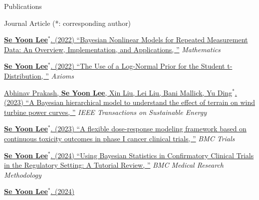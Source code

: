 \documentclass[
	11pt, %
]{resume} %
\begin{document}
\begin{rSection}{Publications}
\begin{rSubsection}{Journal Article (*: corresponding author)}{}{}{}
\item[] [7]
\href{https://www.mdpi.com/2227-7390/10/6/898}
{\underline{\textbf{Se Yoon Lee}$^{*}$}. (2022)
``Bayesian Nonlinear Models for Repeated Measurement Data: An Overview, Implementation, and Applications, ''} \textit{Mathematics} 
\item[] [8]
\href{https://www.mdpi.com/2075-1680/11/9/462}
{\underline{\textbf{Se Yoon Lee}$^{*}$}. (2022)
``The Use of a Log-Normal Prior for the Student t-Distribution, ''} \textit{Axioms} 
\item[] [9]
\href{https://ieeexplore.ieee.org/document/10301539}
{Abhinav Prakash, \underline{\textbf{Se Yoon Lee}}, Xin Liu, Lei Liu,  Bani Mallick, Yu Ding$^{*}$. (2023)
``A Bayesian hierarchical model to understand the effect of terrain on wind turbine power curves, ''} \textit{IEEE Transactions on Sustainable Energy} 
\item[] [10]
\href{https://trialsjournal.biomedcentral.com/articles/10.1186/s13063-023-07793-0}
{\underline{\textbf{Se Yoon Lee}$^{*}$}. (2023)
``A flexible dose-response modeling framework based on continuous toxicity outcomes in phase I cancer clinical trials, ''} \textit{BMC Trials} 
\item[] [11]
\href{https://bmcmedresmethodol.biomedcentral.com/articles/10.1186/s12874-024-02235-0}
{\underline{\textbf{Se Yoon Lee}$^{*}$}. (2024)
	``Using Bayesian Statistics in Confirmatory Clinical Trials in the Regulatory Setting: A Tutorial Review, ''} \textit{BMC Medical Research Methodology} 	
\item[] [12]
\href{https://www.tandfonline.com/doi/full/10.1080/19466315.2024.2368789?src=exp-la}{\underline{\textbf{Se Yoon Lee}$^{*}$}. (2024)
}
\end{rSubsection}
\end{rSection}
\end{document}
